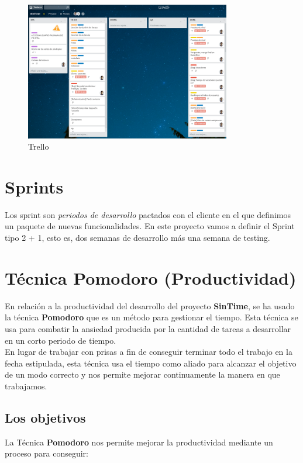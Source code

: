 \begin{figure}[ht]
	\centering
	\includegraphics[width=0.8\textwidth]{imagenes/trello.png}
	\caption{Trello}
	\label{trello}
\end{figure}

\section{Sprints}
Los sprint son \textit{periodos de desarrollo} pactados con el cliente en el que definimos un paquete de nuevas funcionalidades. En este proyecto vamos a definir el Sprint tipo 2 + 1, esto es, dos semanas de desarrollo más una semana de testing.

\section{Técnica Pomodoro (Productividad) \cite{Pomodoro}}

En relación a la productividad del desarrollo del proyecto \textbf{SinTime}, se ha usado la técnica \textbf{Pomodoro} que es un método para gestionar el tiempo. Esta técnica se usa para combatir la ansiedad producida por la cantidad de tareas a desarrollar en un corto periodo de tiempo.\\

En lugar de trabajar con prisas a fin de conseguir terminar todo el trabajo en la fecha estipulada, esta técnica usa el tiempo como aliado para alcanzar el objetivo de un modo correcto y nos permite mejorar continuamente la manera en que trabajamos.

\subsection{Los objetivos}

La Técnica \textbf{Pomodoro} nos permite mejorar la productividad mediante un proceso para conseguir:\\

